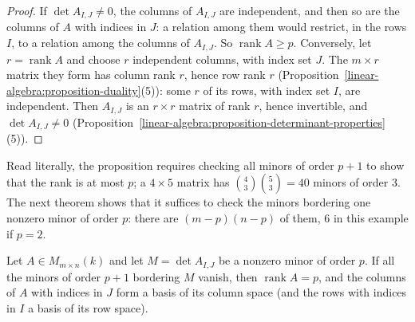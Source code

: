 \begin{proof}
If $\det A_{I,J} \neq 0$, the columns of $A_{I,J}$ are independent, and then so are the columns of $A$ with indices in $J$: a relation among them would restrict, in the rows $I$, to a relation among the
columns of $A_{I,J}$. So $\operatorname{rank}A \geq p$. Conversely, let $r = \operatorname{rank}A$ and choose $r$ independent columns, with index set $J$. The $m \times r$ matrix they form has column rank
$r$, hence row rank $r$ (Proposition~\ref{linear-algebra:proposition-duality}(5)): some $r$ of its rows, with index set $I$, are independent. Then $A_{I,J}$ is an $r \times r$ matrix of rank $r$, hence
invertible, and $\det A_{I,J} \neq 0$ (Proposition~\ref{linear-algebra:proposition-determinant-properties}(5)).
\end{proof}

Read literally, the proposition requires checking all minors of order $p + 1$ to show that the rank is at most $p$; a $4 \times 5$ matrix has $\binom43\binom53 = 40$ minors of order $3$. The next theorem
shows that it suffices to check the minors bordering one nonzero minor of order $p$: there are $(m - p)(n - p)$ of them, $6$ in this example if $p = 2$.

\begin{theorem}\label{linear-algebra:theorem-bordered-minors}
Let $A \in M_{m \times n}(k)$ and let $M = \det A_{I,J}$ be a nonzero minor of order $p$. If all the minors of order $p + 1$ bordering $M$ vanish, then $\operatorname{rank}A = p$, and the columns of $A$
with indices in $J$ form a basis of its column space (and the rows with indices in $I$ a basis of its row space).
\end{theorem}

